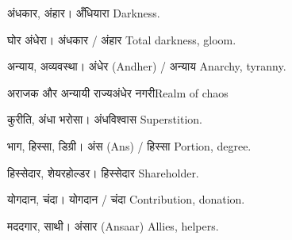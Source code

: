 %
{अंधकार, अंहार।}%
{अँधियारा}%
{Darkness.}

%
{घोर अंधेरा।}%
{अंधकार / अंहार}%
{Total darkness, gloom.}

%
{अन्याय, अव्यवस्था।}%
{अंधेर (Andher) / अन्याय}%
{Anarchy, tyranny.}

%
{अराजक और अन्यायी राज्य}{अंधेर नगरी}{Realm of chaos}

%
{कुरीति, अंधा भरोसा।}%
{अंधविश्वास}%
{Superstition.}

%
{भाग, हिस्सा, डिग्री।}%
{अंस (Ans) / हिस्सा}%
{Portion, degree.}

%
{हिस्सेदार, शेयरहोल्डर।}%
{हिस्सेदार}%
{Shareholder.}

%
{योगदान, चंदा।}%
{योगदान / चंदा}%
{Contribution, donation.}

%
{मददगार, साथी।}%
{अंसार (Ansaar)}%
{Allies, helpers.}
